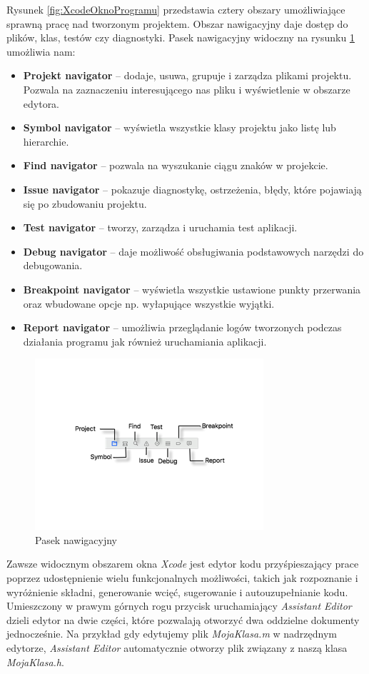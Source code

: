 \documentclass{iiuwb}
\begin{document}
Rysunek \ref{fig:XcodeOknoProgramu} przedstawia cztery obszary umożliwiające sprawną pracę nad tworzonym projektem. Obszar nawigacyjny daje dostęp do plików, klas, testów czy diagnostyki. Pasek nawigacyjny widoczny na rysunku \ref{fig:XcodeNavigationBar} umożliwia nam:
\begin{itemize}
\item \textbf{Projekt navigator} -- dodaje, usuwa, grupuje i zarządza plikami projektu. Pozwala na zaznaczeniu interesującego nas pliku i wyświetlenie w obszarze edytora. 
\item \textbf{Symbol navigator} -- wyświetla wszystkie klasy projektu jako listę lub hierarchie.
\item \textbf{Find navigator} -- pozwala na wyszukanie ciągu znaków w projekcie. 
\item \textbf{Issue navigator} -- pokazuje diagnostykę, ostrzeżenia, błędy, które pojawiają się po zbudowaniu projektu.
\item \textbf{Test navigator} -- tworzy, zarządza i uruchamia test aplikacji.
\item \textbf{Debug navigator} -- daje możliwość obsługiwania podstawowych narzędzi do debugowania.
\item \textbf{Breakpoint navigator} -- wyświetla wszystkie ustawione punkty przerwania oraz wbudowane opcje np. wyłapujące wszystkie wyjątki.
\item \textbf{Report navigator} -- umożliwia przeglądanie logów tworzonych podczas działania programu jak również uruchamiania aplikacji.
\end{itemize}
\begin{figure}[!th]
\centering
\includegraphics[scale=.7]{image/XcodeNavigationBar.png}
\caption{Pasek nawigacyjny}
\label{fig:XcodeNavigationBar}
\end{figure}

Zawsze widocznym obszarem okna \textit{Xcode} jest edytor kodu przyśpieszający prace poprzez udostępnienie wielu funkcjonalnych możliwości, takich jak rozpoznanie i wyróżnienie składni, generowanie wcięć, sugerowanie i autouzupełnianie kodu. Umieszczony w prawym górnych rogu przycisk uruchamiający \textit{Assistant Editor} dzieli edytor na dwie części, które pozwalają otworzyć dwa oddzielne dokumenty jednocześnie. Na przykład gdy edytujemy plik \emph{MojaKlasa.m} w nadrzędnym edytorze, \textit{Assistant Editor} automatycznie otworzy plik związany z naszą klasa \emph{MojaKlasa.h}.
\end{document}
